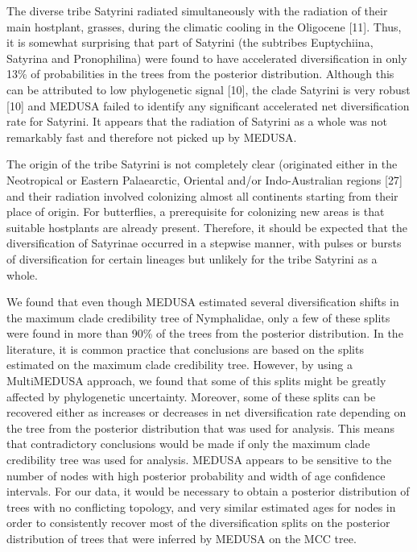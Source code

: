\documentclass[10pt]{article}
\begin{document}
The diverse tribe Satyrini radiated simultaneously with the radiation of
their main hostplant, grasses, during the climatic cooling in the
Oligocene {[}11{]}. Thus, it is somewhat surprising that part of
Satyrini (the subtribes Euptychiina, Satyrina and Pronophilina) were
found to have accelerated diversification in only 13\% of probabilities
in the trees from the posterior distribution. Although this can be
attributed to low phylogenetic signal {[}10{]}, the clade Satyrini is
very robust {[}10{]} and MEDUSA failed to identify any significant
accelerated net diversification rate for Satyrini. It appears that the
radiation of Satyrini as a whole was not remarkably fast and therefore
not picked up by MEDUSA.

The origin of the tribe Satyrini is not completely clear (originated
either in the Neotropical or Eastern Palaearctic, Oriental and/or
Indo-Australian regions {[}27{]} and their radiation involved colonizing
almost all continents starting from their place of origin. For
butterflies, a prerequisite for colonizing new areas is that suitable
hostplants are already present. Therefore, it should be expected that
the diversification of Satyrinae occurred in a stepwise manner, with
pulses or bursts of diversification for certain lineages but unlikely
for the tribe Satyrini as a whole.

We found that even though MEDUSA estimated several diversification
shifts in the maximum clade credibility tree of Nymphalidae, only a few
of these splits were found in more than 90\% of the trees from the
posterior distribution. In the literature, it is common practice that
conclusions are based on the splits estimated on the maximum clade
credibility tree. However, by using a MultiMEDUSA approach, we found
that some of this splits might be greatly affected by phylogenetic
uncertainty. Moreover, some of these splits can be recovered either as
increases or decreases in net diversification rate depending on the tree
from the posterior distribution that was used for analysis. This means
that contradictory conclusions would be made if only the maximum clade
credibility tree was used for analysis. MEDUSA appears to be sensitive
to the number of nodes with high posterior probability and width of age
confidence intervals. For our data, it would be necessary to obtain a
posterior distribution of trees with no conflicting topology, and very
similar estimated ages for nodes in order to consistently recover most
of the diversification splits on the posterior distribution of trees
that were inferred by MEDUSA on the MCC tree.
\end{document}
